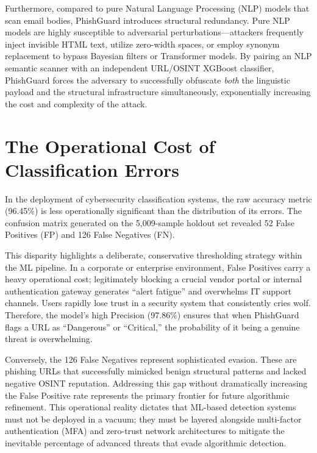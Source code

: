 Furthermore, compared to pure Natural Language Processing (NLP) models
that scan email bodies, PhishGuard introduces structural redundancy.
Pure NLP models are highly susceptible to adversarial
perturbations---attackers frequently inject invisible HTML text, utilize
zero-width spaces, or employ synonym replacement to bypass Bayesian
filters or Transformer models. By pairing an NLP semantic scanner with
an independent URL/OSINT XGBoost classifier, PhishGuard forces the
adversary to successfully obfuscate \emph{both} the linguistic payload
and the structural infrastructure simultaneously, exponentially
increasing the cost and complexity of the attack.

\section{The Operational Cost of Classification
Errors}\label{the-operational-cost-of-classification-errors}

In the deployment of cybersecurity classification systems, the raw
accuracy metric (96.45\%) is less operationally significant than the
distribution of its errors. The confusion matrix generated on the
5,009-sample holdout set revealed 52 False Positives (FP) and 126 False
Negatives (FN).

This disparity highlights a deliberate, conservative thresholding
strategy within the ML pipeline. In a corporate or enterprise
environment, False Positives carry a heavy operational cost;
legitimately blocking a crucial vendor portal or internal authentication
gateway generates ``alert fatigue'' and overwhelms IT support channels.
Users rapidly lose trust in a security system that consistently cries
wolf. Therefore, the model's high Precision (97.86\%) ensures that when
PhishGuard flags a URL as ``Dangerous'' or ``Critical,'' the probability
of it being a genuine threat is overwhelming.

Conversely, the 126 False Negatives represent sophisticated evasion.
These are phishing URLs that successfully mimicked benign structural
patterns and lacked negative OSINT reputation. Addressing this gap
without dramatically increasing the False Positive rate represents the
primary frontier for future algorithmic refinement. This operational
reality dictates that ML-based detection systems must not be deployed in
a vacuum; they must be layered alongside multi-factor authentication
(MFA) and zero-trust network architectures to mitigate the inevitable
percentage of advanced threats that evade algorithmic detection.

